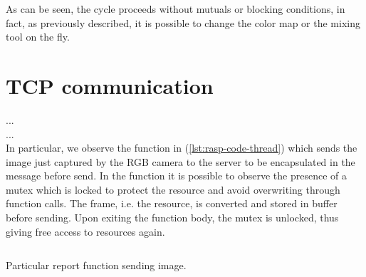 As can be seen, the cycle proceeds without mutuals or blocking conditions, in
fact, as previously described, it is possible to change the color map or the
mixing tool on the fly.
%
\newpage
\section{TCP communication}
\label{ssec:software-TCPSocket}
...\\
...\\
In particular, we observe the function in (\ref{lst:rasp-code-thread}) which 
sends the image just captured by the RGB camera to the server to be 
encapsulated in the message before send. 
In the function it is possible to observe the presence of a mutex which is 
locked to protect the resource and avoid overwriting through function calls. 
The frame, i.e. the resource, is converted and stored in buffer before
sending. Upon exiting the function body, the mutex is unlocked, thus giving free
access to resources again.
\begin{listing}[ht]
\inputminted[frame=lines,framesep=2mm, linenos=true, autogobble, breaklines=true, fontsize=\scriptsize, firstline=84, lastline=95]{c++}{software/code/mainwindow.cpp} 
\caption{Particular report function sending image.} 
\label{lst:rasp-code-thread} 
\end{listing}
